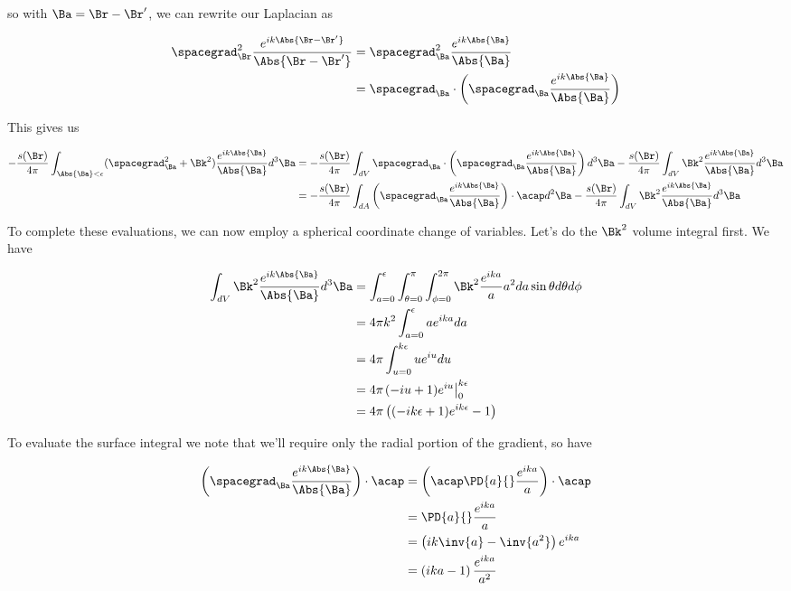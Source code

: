 so with $\Ba = \Br - \Br'$, we can rewrite our Laplacian as

\begin{align*}
\spacegrad_\Br^2 \frac{e^{i k \Abs{\Br - \Br'}}}{\Abs{\Br - \Br'}} 
&= 
\spacegrad_\Ba^2 \frac{e^{i k \Abs{\Ba}}}{\Abs{\Ba}}  \\
&= 
\spacegrad_\Ba \cdot \left(\spacegrad_\Ba \frac{e^{i k \Abs{\Ba}}}{\Abs{\Ba}} \right)
\end{align*}

This gives us

\begin{align*}
-\frac{s(\Br)}{4\pi} 
\int_{\Abs{\Ba} < \epsilon} (\spacegrad_\Ba^2 + \Bk^2) \frac{e^{i k \Abs{\Ba}}}{\Abs{\Ba}} d^3 \Ba 
&=
-\frac{s(\Br)}{4\pi} 
\int_{dV} \spacegrad_\Ba \cdot \left( \spacegrad_\Ba \frac{e^{i k \Abs{\Ba}}}{\Abs{\Ba}} \right) d^3 \Ba 
-\frac{s(\Br)}{4\pi} \int_{dV}
\Bk^2 \frac{e^{i k \Abs{\Ba}}}{\Abs{\Ba}} d^3 \Ba  \\
&=
-\frac{s(\Br)}{4\pi} 
\int_{dA} \left( \spacegrad_\Ba \frac{e^{i k \Abs{\Ba}}}{\Abs{\Ba}} \right) \cdot \acap d^2 \Ba 
-\frac{s(\Br)}{4\pi} 
\int_{dV}
\Bk^2 \frac{e^{i k \Abs{\Ba}}}{\Abs{\Ba}} d^3 \Ba 
\end{align*}

To complete these evaluations, we can now employ a spherical coordinate change of variables.  Let's do the $\Bk^2$ volume integral first.  We have

\begin{align*}
\int_{dV}
\Bk^2 \frac{e^{i k \Abs{\Ba}}}{\Abs{\Ba}} d^3 \Ba 
&=
\int_{a = 0}^\epsilon \int_{\theta = 0}^\pi \int_{\phi=0}^{2\pi}
\Bk^2 \frac{e^{i k a}}{a} a^2 da \sin\theta d\theta d\phi \\
&=
4\pi k^2
\int_{a = 0}^\epsilon 
a e^{i k a} da  \\
&=
4\pi 
\int_{u = 0}^{k\epsilon}
u e^{i u} du  \\
&=
4\pi 
{\left.
(-i u + 1) e^{i u} \right\vert}_0^{k \epsilon} \\
&=
4 \pi \left( (-i k \epsilon + 1)e^{i k \epsilon} - 1 \right)
\end{align*}

To evaluate the surface integral we note that we'll require only the radial portion of the gradient, so have

\begin{align*}
\left( \spacegrad_\Ba \frac{e^{i k \Abs{\Ba}}}{\Abs{\Ba}} \right) \cdot \acap
&=
\left( \acap \PD{a}{} \frac{e^{i k a}}{a} \right) \cdot \acap \\
&=
\PD{a}{} \frac{e^{i k a}}{a} \\
&=
\left( i k \inv{a} - \inv{a^2} \right)
e^{i k a} \\
&=
\left( i k a - 1 \right)
\frac{e^{i k a}}{a^2}
\end{align*}

